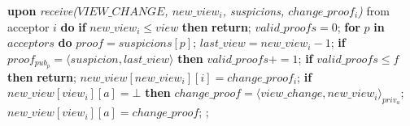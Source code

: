 \begin{algorithm}
\begin{multicols}{2}
\begin{algorithmic}[1]
			\State\textbf{upon} \textit{receive($VIEW\_CHANGE$, $new\_view_i$, suspicions, $change\_proof_i$)} from acceptor $i$ \textbf{do} 
			\State\hspace{\algorithmicindent} \textbf{if} $new\_view_i \leq view$ \textbf{then}
			\State\hspace{\algorithmicindent}\hspace{\algorithmicindent}\textbf{return};
			\State\hspace{\algorithmicindent} $valid\_proofs = 0$;
			\State\hspace{\algorithmicindent} \textbf{for} $p$ \textbf{in} $acceptors$ \textbf{do} 
			\State\hspace{\algorithmicindent}\hspace{\algorithmicindent} $proof = suspicions[p]$;
			\State\hspace{\algorithmicindent}\hspace{\algorithmicindent} $last\_view = new\_view_i-1$;
			\State\hspace{\algorithmicindent}\hspace{\algorithmicindent} \textbf{if} $proof_{pub_p} = \langle suspicion, last\_view \rangle$ \textbf{then}
			\State\hspace{\algorithmicindent}\hspace{\algorithmicindent}\hspace{\algorithmicindent} $valid\_proofs \mathrel{+{=}} 1$;
			\State\hspace{\algorithmicindent} \textbf{if} $valid\_proofs \leq f$ \textbf{then}
			\State\hspace{\algorithmicindent}\hspace{\algorithmicindent} \textbf{return};
			\State\hspace{\algorithmicindent} $new\_view[new\_view_i][i] = change\_proof_i$;
			\State\hspace{\algorithmicindent} \textbf{if} $new\_view[view_i][a] = \bot$ \textbf{then}				
			\State\hspace{\algorithmicindent}\hspace{\algorithmicindent} $change\_proof = \langle view\_change, new\_view_i \rangle_{priv_a}$;
			\State\hspace{\algorithmicindent}\hspace{\algorithmicindent} $new\_view[view_i][a] = change\_proof$;
			\State\hspace{\algorithmicindent}\hspace{\algorithmicindent}  ;

\end{algorithmic}
\end{multicols}
\end{algorithm}
